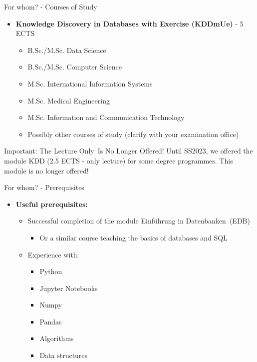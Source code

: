 \begin{frame}{For whom? - Courses of Study}
	\begin{itemize}
		\item \textbf{Knowledge Discovery in Databases with Exercise (KDDmUe)} - 5 ECTS
		      \begin{itemize}
			      \item B.Sc./M.Sc. Data Science
			      \item B.Sc./M.Sc. Computer Science
			      \item M.Sc. International Information Systems
			      \item M.Sc. Medical Engineering
			      \item M.Sc. Information and Communication Technology
			      \item {\color{gray} Possibly other courses of study (clarify with your examination office)}
		      \end{itemize}
	\end{itemize}

	\begin{alertblock}{Important: The \glqq Lecture Only\grqq\ Is No Longer Offered!}
		Until SS2023, we offered the module KDD (2.5 ECTS - only lecture) for some degree programmes. This module is no longer offered!
	\end{alertblock}

\end{frame}

\begin{frame}{For whom? - Prerequisites}
	\begin{itemize}
		\item \textbf{Useful prerequisites:}
		      \begin{itemize}
			      \item Successful completion of the module \glqq Einführung in Datenbanken\grqq~(EDB)
			            \begin{itemize}
				            \item Or a similar course teaching the basics of databases and SQL
			            \end{itemize}
			      \item Experience with:
			            \begin{itemize}
				            \item Python
				            \item Jupyter Notebooks
				            \item Numpy
				            \item Pandas
				            \item Algorithms
				            \item Data structures
			            \end{itemize}
		      \end{itemize}
	\end{itemize}

\end{frame}


